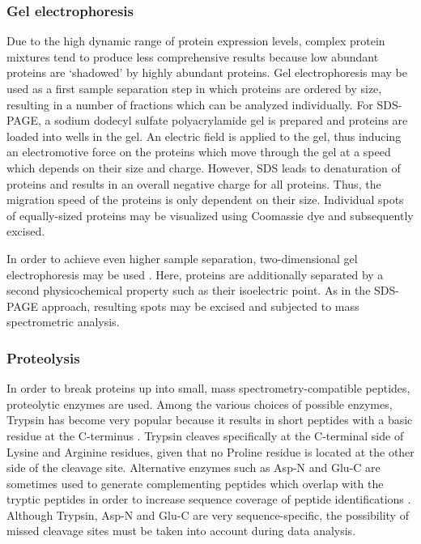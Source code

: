 \subsubsection{Gel electrophoresis}

Due to the high dynamic range of protein expression levels, complex protein 
mixtures tend to produce less comprehensive results because low abundant 
proteins are `shadowed' by highly abundant proteins. 
Gel electrophoresis may be used as a first sample separation step in which
proteins are ordered by size, resulting in a number of fractions which can
be analyzed individually.
For SDS-PAGE, a sodium dodecyl sulfate polyacrylamide gel is prepared and
proteins are loaded into wells in the gel.
An electric field is applied to the gel, thus inducing an electromotive force 
on the proteins which move through the gel at a speed which depends on their
size and charge.
However, SDS leads to denaturation of proteins and results in an overall
negative charge for all proteins. 
Thus, the migration speed of the proteins is only dependent on their size. 
Individual spots of equally-sized proteins may be visualized using Coomassie 
dye and subsequently excised.

In order to achieve even higher sample separation, two-dimensional gel 
electrophoresis may be used \citep{Klose1975, O'Farrell1975}.
Here, proteins are additionally separated by a second physicochemical property
such as their isoelectric point.
As in the SDS-PAGE approach, resulting spots may be excised and subjected 
to mass spectrometric analysis.

\subsubsection{Proteolysis}

In order to break proteins up into small, mass spectrometry-compatible peptides, 
proteolytic enzymes are used.
Among the various choices of possible enzymes, Trypsin has become very popular
because it results in short peptides with a basic residue at the C-terminus
\citep{Olsen2004}.
Trypsin cleaves specifically at the C-terminal side of Lysine and Arginine 
residues, given that no Proline residue is located at the other side of the 
cleavage site.
Alternative enzymes such as Asp-N and Glu-C are sometimes used to generate
complementing peptides which overlap with the tryptic peptides in order to 
increase sequence coverage of peptide identifications \citep{Steen2004}.
Although Trypsin, Asp-N and Glu-C are very sequence-specific, the possibility 
of missed cleavage sites must be taken into account during data analysis.

